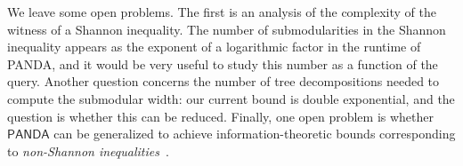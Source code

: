 \documentclass{theoretics}
\newcommand{\panda}{\textsf{PANDA}\xspace}
\begin{document}
We leave some open problems.  The first is an analysis of the
complexity of the witness of a Shannon inequality.  The number of
submodularities in the Shannon inequality appears as the exponent
of a logarithmic factor in the runtime of \panda, and it would be very useful to
study this number as a function of the query.
Another question concerns the
number of tree decompositions needed to compute the submodular width:
our current bound is double exponential, and the question is whether
this can be reduced.  Finally, one open problem is whether $\panda$
can be generalized to achieve information-theoretic bounds
corresponding to {\em non-Shannon
  inequalities}~\cite{DBLP:journals/tit/ZhangY97,zhang1998characterization}.



\printbibliography
\end{document}
